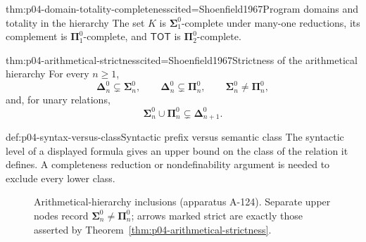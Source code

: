 \begin{hbtheorem}{thm:p04-domain-totality-completeness}{cited=Shoenfield1967}{Program domains and totality in the hierarchy}
The set \(K\) is \(\boldsymbol\Sigma^0_1\)-complete under many-one
reductions, its complement is \(\boldsymbol\Pi^0_1\)-complete, and
\(\mathsf{TOT}\) is \(\boldsymbol\Pi^0_2\)-complete.
\end{hbtheorem}

\begin{hbtheorem}{thm:p04-arithmetical-strictness}{cited=Shoenfield1967}{Strictness of the arithmetical hierarchy}
For every \(n\geq1\),
\[
 \boldsymbol\Delta^0_n\subsetneq\boldsymbol\Sigma^0_n,
 \qquad
 \boldsymbol\Delta^0_n\subsetneq\boldsymbol\Pi^0_n,
 \qquad
 \boldsymbol\Sigma^0_n\neq\boldsymbol\Pi^0_n,
\]
and, for unary relations,
\[
 \boldsymbol\Sigma^0_n\cup\boldsymbol\Pi^0_n
 \subsetneq\boldsymbol\Delta^0_{n+1}.
\]
\end{hbtheorem}

\begin{hbwarning}{def:p04-syntax-versus-class}{Syntactic prefix versus semantic class}
The syntactic level of a displayed formula gives an upper bound on the class
of the relation it defines.  A completeness reduction or nondefinability
argument is needed to exclude every lower class.
\end{hbwarning}

\begin{figure}[htbp]
\centering
{}
\caption{Arithmetical-hierarchy inclusions (apparatus A-124).  Separate
upper nodes record \(\boldsymbol\Sigma^0_n\neq\boldsymbol\Pi^0_n\);
arrows marked strict are exactly those asserted by
Theorem~\ref{thm:p04-arithmetical-strictness}.}
\label{fig:p04-arithmetical-hierarchy}
\end{figure}

